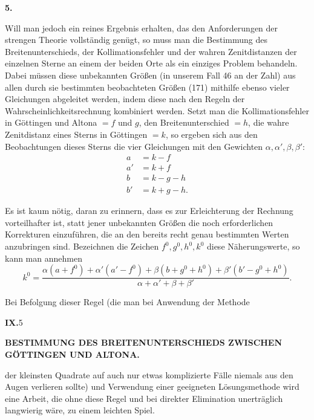 \begin{center}\textbf{5.}\end{center}

Will man jedoch ein reines Ergebnis erhalten, das den Anforderungen der
strengen Theorie vollständig genügt, so muss man die Bestimmung des
Breitenunterschieds, der Kollimationsfehler und der wahren Zenitdistanzen der
einzelnen Sterne an einem der beiden Orte als ein einziges Problem behandeln. Dabei
müssen diese unbekannten Größen (in unserem Fall 46 an der Zahl) aus allen
durch sie bestimmten beobachteten Größen (171) mithilfe ebenso vieler
Gleichungen abgeleitet werden, indem diese nach den Regeln der
Wahrscheinlichkeitsrechnung kombiniert werden. Setzt man die Kollimationsfehler
in Göttingen und Altona \(=f\) und \(g\), den Breitenunterschied \(=h\), die
wahre Zenitdistanz eines Sterns in Göttingen \(=k\), so ergeben sich aus den
Beobachtungen dieses Sterns die vier Gleichungen mit den Gewichten \(\alpha,\alpha',\beta,\beta'\):
\[
\begin{aligned}
a&=k-f\\
a'&=k+f\\
b&=k-g-h\\
b'&=k+g-h.
\end{aligned}
\]

Es ist kaum nötig, daran zu erinnern, dass es zur Erleichterung der Rechnung
vorteilhafter ist, statt jener unbekannten Größen die noch erforderlichen
Korrekturen einzuführen, die an den bereits recht genau bestimmten Werten
anzubringen sind. Bezeichnen die Zeichen \(f^0,g^0,h^0,k^0\) diese Näherungswerte,
so kann man annehmen
\[
k^0=\frac{\alpha(a+f^0)+\alpha'(a'-f^0)+\beta(b+g^0+h^0)+\beta'(b'-g^0+h^0)}
{\alpha+\alpha'+\beta+\beta'}.
\]

Bei Befolgung dieser Regel (die man bei Anwendung der Methode
\par\smallskip
\noindent\textbf{IX.}\hfill 5\hspace{.12\textwidth}\par

\par\clearpage
\noindent{}\parbox[t]{\dimexpr\linewidth-24mm\relax}{\centering\scriptsize\bfseries BESTIMMUNG DES BREITENUNTERSCHIEDS ZWISCHEN GÖTTINGEN UND ALTONA.}\makebox[12mm][r]{}\par\medskip

\noindent der kleinsten Quadrate auf auch nur etwas komplizierte Fälle niemals
aus den Augen verlieren sollte) und Verwendung einer geeigneten 
Lösungsmethode wird eine Arbeit, die ohne diese Regel und bei direkter
Elimination unerträglich langwierig wäre, zu einem leichten Spiel.

